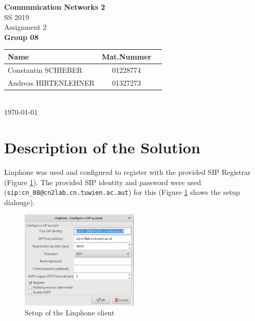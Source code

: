 \documentclass[parskip=full]{scrartcl}
\begin{document}
\begin{titlepage}
    \centering
    \vspace*{2cm}
    {\Huge \textbf{Communication Networks 2}}\\
    SS 2019\\
    \vspace*{1cm}
    {\Large Assignment 2}
    \\\vspace*{3cm}
    {\Large \textbf{Group 08}}\\
    \vspace*{1cm}
    {\large 
        \begin{tabular}{l c c}
            Name & Mat.Nummer \\ \hline
            Constantin SCHIEBER & 01228774 \\
            Andreas HIRTENLEHNER & 01327273
        \end{tabular}
    }
    \\\vspace*{7cm}
    \today
\end{titlepage}

\section{Description of the Solution}
Linphone was used and configured to register with the provided SIP Registrar (Figure \ref{fig:registerLinphone}).
The provided SIP identity and password were used (\texttt{sip:cn\_08@cn2lab.cn.tuwien.ac.aut}) for this (Figure \ref{fig:registerLinphone} shows the setup dialouge).
\begin{figure}[ht]
    \centering
   \includegraphics[width=0.5\textwidth]{images/linphoneSettings.png} 
    \caption{Setup of the Linphone client}
    \label{fig:registerLinphone}
\end{figure}
\end{document}
